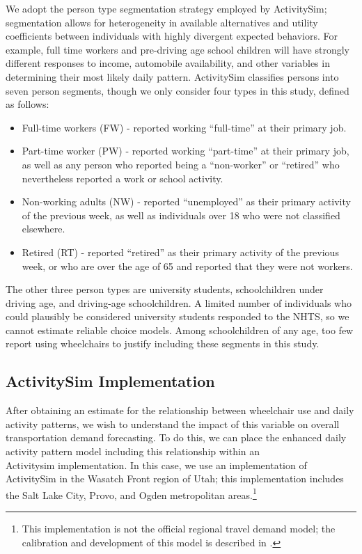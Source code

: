 \documentclass[3p, authoryear, review]{elsarticle} %
\providecommand{\tightlist}{%
  \setlength{\itemsep}{0pt}\setlength{\parskip}{0pt}}
\begin{document}
We adopt the person type segmentation strategy employed by ActivitySim;
segmentation allows for heterogeneity in available alternatives and utility
coefficients between individuals with highly divergent expected behaviors. For
example, full time workers and pre-driving age school children will have
strongly different responses to income, automobile availability, and other
variables in determining their most likely daily pattern.
ActivitySim classifies persons into seven person segments, though we only
consider four types in this study, defined as follows:

\begin{itemize}
\tightlist
\item
  Full-time workers (FW) - reported working ``full-time'' at their primary job.
\item
  Part-time worker (PW) - reported working ``part-time'' at their primary job,
  as well as any person who reported being a ``non-worker'' or ``retired'' who nevertheless
  reported a work or school activity.
\item
  Non-working adults (NW) - reported ``unemployed'' as their primary activity
  of the previous week, as well as individuals over 18 who were not classified
  elsewhere.
\item
  Retired (RT) - reported ``retired'' as their primary activity of the previous
  week, or who are over the age of 65 and reported that they were not workers.
\end{itemize}

The other three person types are university students, schoolchildren under
driving age, and driving-age schoolchildren. A limited number of individuals who
could plausibly be considered university students responded to the NHTS, so we
cannot estimate reliable choice models. Among schoolchildren of any age, too few
report using wheelchairs to justify including these segments in this study.

\hypertarget{activitysim-implementation}{%
\subsection{ActivitySim Implementation}\label{activitysim-implementation}}

After obtaining an estimate for the relationship between wheelchair use and
daily activity patterns, we wish to understand the impact of this variable on
overall transportation demand forecasting. To do this, we can place the
enhanced daily activity pattern model including this relationship within an\\
Activitysim implementation. In this case, we use an implementation of ActivitySim
in the Wasatch Front region of Utah; this implementation includes the Salt Lake
City, Provo, and Ogden metropolitan areas.\footnote{This implementation is not the
  official regional travel demand model; the calibration and development of this
  model is described in \citet{udotwheelchairs}.}
\end{document}
